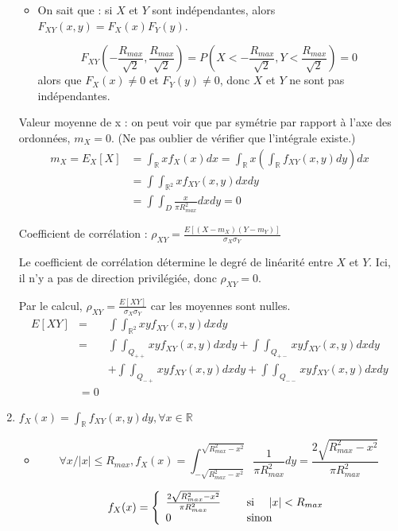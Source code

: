 \documentclass[main.tex]{subfiles}
\begin{document}
\begin{enumerate}
\begin{itemize}
	\item On sait que : si $X$ et $Y$ sont indépendantes, alors $F_{XY}(x,y)=F_X(x)F_Y(y)$.
	
	\[F_{XY}(-\frac{R_{max}}{\sqrt{2}},\frac{R_{max}}{\sqrt{2}}) = P(X<-\frac{R_{max}}{\sqrt{2}},Y<\frac{R_{max}}{\sqrt{2}}) = 0\] alors que $F_X(x)\neq0$ et $F_Y(y)\neq0$, donc $X$ et $Y$ ne sont pas indépendantes.
	\end{itemize}
	
	\medskip
	
	Valeur moyenne de x : on peut voir que par symétrie par rapport à l'axe des ordonnées, $m_X=0$. (Ne pas oublier de vérifier que l'intégrale existe.)
	\begin{align*}
	m_X=E_X[X]& =\int_{\mathbb{R}}xf_X(x)dx=\int_{\mathbb{R}}x (\int_{\mathbb{R}}f_{XY}(x,y)dy) dx \\
	& = \int\int_{\mathbb{R}^2} x f_{XY}(x,y)dxdy \\
	& = \int\int_D \frac{x}{\pi R_{max}^2} dxdy = 0
	\end{align*}
	
	Coefficient de corrélation : $\rho_{XY} = \frac{E[(X-m_X)(Y-m_Y)]}{\sigma_X\sigma_Y}$
	
	Le coefficient de corrélation détermine le degré de linéarité entre $X$ et $Y$. Ici, il n'y a pas de direction privilégiée, donc $\rho_{XY} = 0$.
	
	Par le calcul, $\rho_{XY} = \frac{E[XY]}{\sigma_X\sigma_Y}$ car les moyennes sont nulles.
	\begin{eqnarray*}
	E[XY] & = & \int\int_{\mathbb{R}^2} xyf_{XY}(x,y)dxdy  \\
	& = &  \int\int_{Q_{++}} xyf_{XY}(x,y)dxdy + \int\int_{Q_{+-}} xyf_{XY}(x,y)dxdy \\ & &+ \int\int_{Q_{-+}} xyf_{XY}(x,y)dxdy + \int\int_{Q_{--}} xyf_{XY}(x,y)dxdy \\
	& = 0	
	\end{eqnarray*}
	
\item $f_X(x) = \int_{\mathbb{R}}f_{XY}(x,y)dy, \forall x \in \mathbb{R}$

	\begin{itemize}
	\item \[ \forall x / |x| \leq R_{max}, f_X(x) = \int_{-\sqrt{R_{max}^2-x^2}}^{\sqrt{R_{max}^2-x^2}} \frac{1}{\pi R_{max}^2}dy=\frac{2\sqrt{R_{max}^2-x^2}}{\pi R_{max}^2}\]

	\[
	f_X(x) = 
	\left\{
	\begin{array}{ll}
	\frac{2\sqrt{R_{max}^2-x^2}}{\pi R_{max}^2} &\quad\text{ si }\quad |x| < R_{max} \\
	0 &\quad\text{ sinon}\quad
	\end{array}
	\right.	
	\]
	

\end{itemize}
\end{enumerate}
\end{document}
